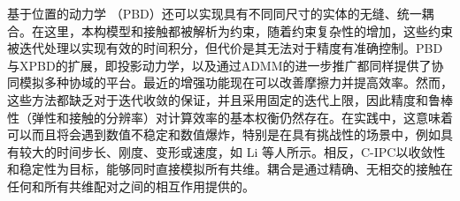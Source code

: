 基于位置的动力学 （PBD）还可以实现具有不同同尺寸的实体的无缝、统一耦合。在这里，本构模型和接触都被解析为约束，随着约束复杂性的增加，这些约束被迭代处理以实现有效的时间积分，但代价是其无法对于精度有准确控制。PBD与XPBD的扩展，即投影动力学，以及通过ADMM的进一步推广都同样提供了协同模拟多种协域的平台。最近的增强功能现在可以改善摩擦力并提高效率。然而，这些方法都缺乏对于迭代收敛的保证，并且采用固定的迭代上限，因此精度和鲁棒性（弹性和接触的分辨率）对计算效率的基本权衡仍然存在。在实践中，这意味着可以而且将会遇到数值不稳定和数值爆炸，特别是在具有挑战性的场景中，例如具有较大的时间步长、刚度、变形或速度，如 Li 等人所示。相反，C-IPC以收敛性和稳定性为目标，能够同时直接模拟所有共维。耦合是通过精确、无相交的接触在任何和所有共维配对之间的相互作用提供的。




